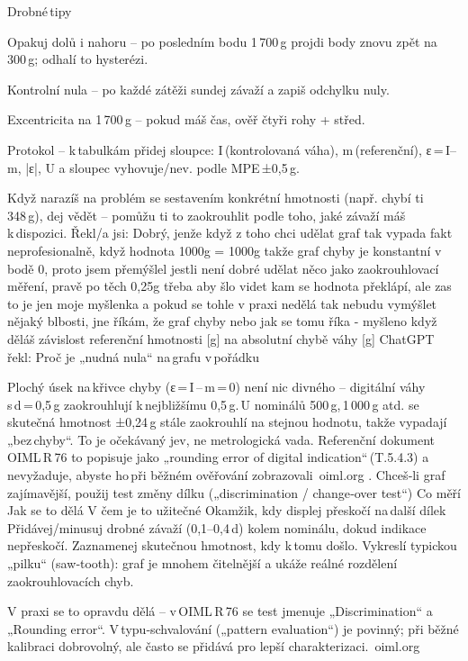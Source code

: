 Drobné tipy

    Opakuj dolů i nahoru – po posledním bodu 1 700 g projdi body znovu zpět na 300 g; odhalí to hysterézi.

    Kontrolní nula – po každé zátěži sundej závaží a zapiš odchylku nuly.

    Excentricita na 1 700 g – pokud máš čas, ověř čtyři rohy + střed.

    Protokol – k tabulkám přidej sloupce: I (kontrolovaná váha), m (referenční), ε = I–m, |ε|, U a sloupec vyhovuje/nev. podle MPE ±0,5 g.

Když narazíš na problém se sestavením konkrétní hmotnosti (např. chybí ti 348 g), dej vědět – pomůžu ti to zaokrouhlit podle toho, jaké závaží máš k dispozici.
Řekl/a jsi:
Dobrý, jenže když z toho chci udělat graf tak vypada fakt neprofesionalně, když hodnota 1000g = 1000g takže graf chyby je konstantní v bodě 0, proto jsem přemýšlel jestli není dobré udělat něco jako zaokrouhlovací měření, pravě po těch 0,25g třeba aby šlo videt kam se hodnota překlápí, ale zas to je jen moje myšlenka a pokud se tohle v praxi nedělá tak nebudu vymýšlet nějaký blbosti, jne říkám, že graf chyby nebo jak se tomu říka - myšleno když děláš závislost referenční hmotnosti [g] na absolutní chybě váhy [g]
ChatGPT řekl:
Proč je „nudná nula“ na grafu v pořádku

Plochý úsek na křivce chyby (ε = I – m = 0) není nic divného – digitální váhy s d = 0,5 g zaokrouhlují k nejbližšímu 0,5 g. U nominálů 500 g, 1 000 g atd. se skutečná hmotnost ±0,24 g stále zaokrouhlí na stejnou hodnotu, takže vypadají „bez chyby“. To je očekávaný jev, ne metrologická vada. Referenční dokument OIML R 76 to popisuje jako „rounding error of digital indication“ (T.5.4.3) a nevyžaduje, abyste ho při běžném ověřování zobrazovali 
oiml.org
.
Chceš‐li graf zajímavější, použij test změny dílku („discrimination / change‑over test“)
Co měří	Jak se to dělá	V čem je to užitečné
Okamžik, kdy displej přeskočí na další dílek	Přidávej/minusuj drobné závaží (0,1–0,4 d) kolem nominálu, dokud indikace nepřeskočí. Zaznamenej skutečnou hmotnost, kdy k tomu došlo.	Vykreslí typickou „pilku“ (saw‑tooth): graf je mnohem čitelnější a ukáže reálné rozdělení zaokrouhlovacích chyb.

    V praxi se to opravdu dělá – v OIML R 76 se test jmenuje „Discrimination“ a „Rounding error“. V typu‑schvalování („pattern evaluation“) je povinný; při běžné kalibraci dobrovolný, ale často se přidává pro lepší charakterizaci. 
    oiml.org

